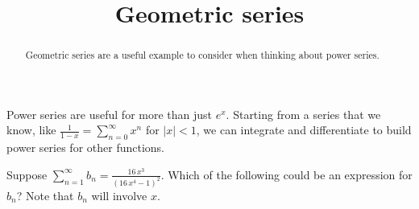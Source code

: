 \documentclass{ximera}
\title{Geometric series}
\begin{document}
\begin{abstract}
  Geometric series are a useful example to consider when thinking about power series.
\end{abstract}

\maketitle

Power series are useful for more than just \(e^x\).  Starting from a series that we know, like \(\frac{1}{1-x} = \sum_{n=0}^\infty x^n\) for \(|x| < 1\), we can integrate and differentiate to build power series for other functions.


\begin{question}
  Suppose \(\displaystyle\sum_{n=1}^\infty b_n = \displaystyle\frac{16 \, x^{3}}{{\left(16 \, x^{4} - 1\right)}^{2}}\).  Which of the following could be an expression for \(b_n\)?  Note that \(b_n\) will involve \(x\).
  

\end{question}
\end{document}
